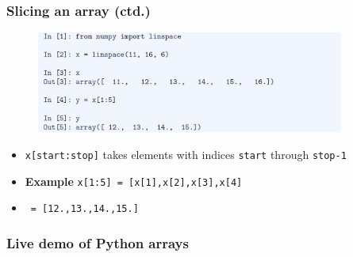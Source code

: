 \documentclass[14pt]{beamer}
\begin{document}

\begin{frame}[fragile]

\frametitle{Slicing an array (ctd.)}

\vspace*{-5mm}

\begin{figure}[ht]
	\centering
	\includegraphics[width=0.9\textwidth]{figures/LLp51}
\end{figure}

\vspace*{-5mm}

\begin{itemize}
	\item[] \texttt{x[start:stop]} takes elements with indices \texttt{start} through \texttt{stop-1}
	\item[] \textbf{Example} \texttt{x[1:5]~=~[x[1],x[2],x[3],x[4]}
	\item[] \qquad\qquad~\texttt{=~[12.,13.,14.,15.]}
%
\end{itemize}

\end{frame}


\begin{frame}[fragile]
\frametitle{Live demo of Python arrays}

\end{frame}
\end{document}
